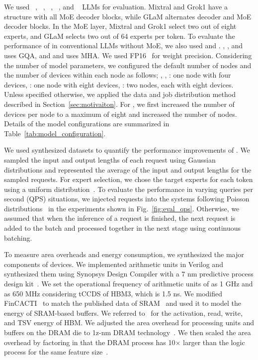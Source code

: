 We used \mixtral~\cite{arxiv-2024-mixtral}, \glam~\cite{icml-2022-GLaM}, \grok~\cite{grok1}, \opt~\cite{arxiv-2022-opt}, and \llama~\cite{2024-llama3} LLMs for evaluation. 
Mixtral and Grok1 have a structure with all MoE decoder blocks, while GLaM alternates decoder and MoE decoder blocks.
In the MoE layer, Mixtral and Grok1 select two out of eight experts, and GLaM selects two out of 64 experts per token.
To evaluate the performance of \duplex in conventional LLMs without MoE, we also used \opt and \llama.
\mixtral, \grok, and \llama uses GQA, and \glam and \opt uses MHA.
We used FP16~\cite{openai-fp16 ,arxiv-2022-opt} for weight precision.
Considering the number of model parameters, we configured the default number of nodes and the number of devices within each node as follows; \mixtral, \opt, \llama: one node with four devices, \glam: one node with eight devices, \grok: two nodes, each with eight devices.
Unless specified otherwise, we applied the data and job distribution method described in Section~\ref{sec:motivaiton}. 
For \doublegpu, we first increased the number of devices per node to a maximum of eight and increased the number of nodes.
Details of the model configurations are summarized in Table~\ref{tab:model_configuration}.

We used synthesized datasets to quantify the performance improvements of \duplex. 
We sampled the input and output lengths of each request using Gaussian distributions and represented the average of the input and output lengths for the sampled requests.
For expert selection, we chose the target experts for each token using a uniform distribution~\cite{jmlr-2022-switchtransformer}. 
To evaluate the performance in varying queries per second (QPS) situations, we injected requests into the systems following Poisson distributions~\cite{osdi-2022-orca, isca-2024-splitwise, ics-2024-clay} in the experiments shown in Fig.~\ref{fig:eval_qps}.
Otherwise, we assumed that when the inference of a request is finished, the next request is added to the batch and processed together in the next stage using continuous batching.

To measure area overheads and energy consumption, we synthesized the major components of \duplex devices.
We implemented arithmetic units in Verilog and synthesized them using Synopsys Design Compiler with a 7 nm predictive process design kit~\cite{asap7-2016}.
We set the operational frequency of arithmetic units %
of \highp as 1 GHz and \lowp as 650 MHz considering tCCDS of HBM3, which is 1.5 ns.
We modified FinCACTI~\cite{fincacti-2014} to match the published data of SRAM~\cite{isscc-2017-7nm-sram, whitepaper-2018-irds,vlsit-2018-samsung, isca-2021-tpuv4i, isscc-2018-7nm-sram-euv, iedm-2016-tsmc7nm} and used it to model the energy of SRAM-based buffers.
We referred to~\cite{MICRO-2017-fine-grained-dram} for the activation, read, write, and TSV energy of HBM.
We adjusted the area overhead for processing units and buffers on the DRAM die to 1z-nm DRAM technology~\cite{jssc-2022-hynix-hbm3, jssc-2023-samsung-hbm3}.
We then scaled the area overhead by factoring in that the DRAM process has 10$\times$ larger than the logic process for the same feature size~\cite{hotchips-2019-upmem}.

